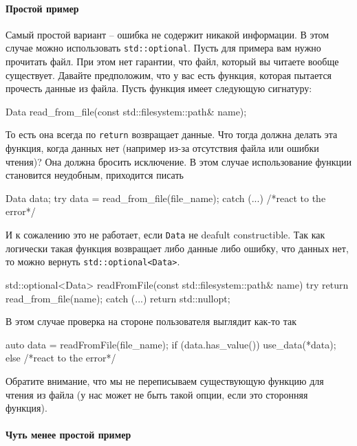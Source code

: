 \paragraph{Простой пример}

Самый простой вариант -- ошибка не содержит никакой информации.
В этом случае можно использовать \verb"std::optional".
Пусть для примера вам нужно прочитать файл.
При этом нет гарантии, что файл, который вы читаете вообще существует.
Давайте предположим, что у вас есть функция, которая пытается прочесть данные из файла.
Пусть функция имеет следующую сигнатуру:
\begin{cppcode}
Data read_from_file(const std::filesystem::path& name);
\end{cppcode}
То есть она всегда по \verb"return" возвращает данные.
Что тогда должна делать эта функция, когда данных нет (например из-за отсутствия файла или ошибки чтения)?
Она должна бросить исключение.
В этом случае использование функции становится неудобным, приходится писать
\begin{cppcode}
Data data;
try {
  data = read_from_file(file_name);
} catch (...) {
  /*react to the error*/
}
\end{cppcode}
И к сожалению это не работает, если \verb"Data" не deafult constructible.
Так как логически такая функция возвращает либо данные либо ошибку, что данных нет, то можно вернуть \verb"std::optional<Data>".
\begin{cppcode}
std::optional<Data> readFromFile(const std::filesystem::path& name) {
  try {
    return read_from_file(name);
  } catch (...) {
    return std::nullopt;
  }
}
\end{cppcode}
В этом случае проверка на стороне пользователя выглядит как-то так
\begin{cppcode}
auto data = readFromFile(file_name);
if (data.has_value()) {
  use_data(*data);
} else {
  /*react to the error*/
}
\end{cppcode}
Обратите внимание, что мы не переписываем существующую функцию для чтения из файла (у нас может не быть такой опции, если это сторонняя функция).

\paragraph{Чуть менее простой пример}

